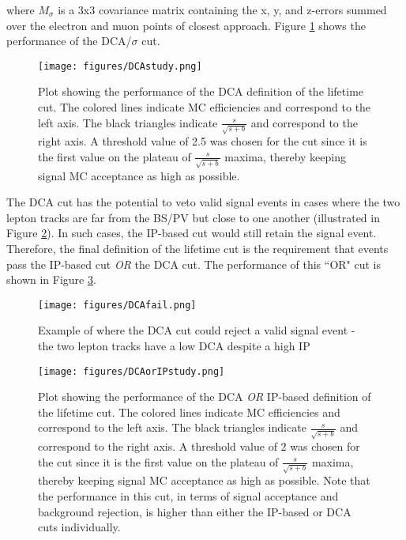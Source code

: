 \noindent where $M_\sigma$ is a 3x3 covariance matrix containing the x, y, and z-errors summed over the electron and muon points of closest approach. Figure \ref{fig:DCAstudy} shows the performance of the DCA/$\sigma$ cut.

\begin{figure}[tbh!]
\centering
\texttt{[image: figures/DCAstudy.png]}
\caption{Plot showing the performance of the DCA definition of the lifetime cut. The colored lines indicate MC efficiencies and correspond to the left axis. The black triangles indicate $\frac{s}{\sqrt{s+b}}$ and correspond to the right axis. A threshold value of 2.5 was chosen for the cut since it is the first value on the plateau of $\frac{s}{\sqrt{s+b}}$ maxima, thereby keeping signal MC acceptance as high as possible.}
\label{fig:DCAstudy}
\end{figure}

The DCA cut has the potential to veto valid signal events in cases where the two lepton tracks are far from the BS/PV but close to one another (illustrated in Figure \ref{fig:DCAfail}). In such cases, the IP-based cut would still retain the signal event. Therefore, the final definition of the lifetime cut is the requirement that events pass the IP-based cut \emph{OR} the DCA cut. The performance of this ``OR" cut is shown in Figure \ref{fig:DCAorIPstudy}.

\begin{figure}[tbh!]
\centering
\texttt{[image: figures/DCAfail.png]}
\caption{Example of where the DCA cut could reject a valid signal event - the two lepton tracks have a low DCA despite a high IP}
\label{fig:DCAfail}
\end{figure}

\begin{figure}[tbh!]
\centering
\texttt{[image: figures/DCAorIPstudy.png]}
\caption{Plot showing the performance of the DCA \emph{OR} IP-based definition of the lifetime cut. The colored lines indicate MC efficiencies and correspond to the left axis. The black triangles indicate $\frac{s}{\sqrt{s+b}}$ and correspond to the right axis. A threshold value of 2 was chosen for the cut since it is the first value on the plateau of $\frac{s}{\sqrt{s+b}}$ maxima, thereby keeping signal MC acceptance as high as possible. Note that the performance in this cut, in terms of signal acceptance and background rejection, is higher than either the IP-based or DCA cuts individually.}
\label{fig:DCAorIPstudy}
\end{figure}

